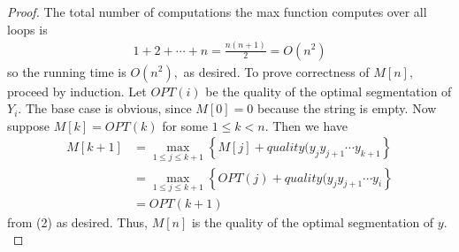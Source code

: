 \documentclass{article}
\begin{document}
\begin{proof}
	The total number of computations the max function computes over all loops is 
	\begin{align*}
		1+2+\cdots+n=\frac{n(n+1)}{2} = O(n^2)
	\end{align*}
	so the running time is $O(n^2),$ as desired. To prove correctness of $M[n],$ proceed by induction. Let $OPT(i)$ be the quality of the optimal segmentation of $Y_i.$ The base case is obvious, since $M[0]=0$ because the string is empty. Now suppose $M[k]=OPT(k)$ for some $1\le k<n.$ Then we have
	\begin{align*}
		M[k+1] &= \max_{1\le j\le k+1} \left\{ M[j] + quality(y_jy_{j+1}\cdots y_{k+1} \right\} \\
		&= \max_{1\le j\le k+1}\left\{ OPT(j)+quality(y_jy_{j+1}\cdots y_i \right\} \\
		&= OPT(k+1)
	\end{align*}
	from (2) as desired. Thus, $M[n]$ is the quality of the optimal segmentation of $y.$
\end{proof}
\end{document}
